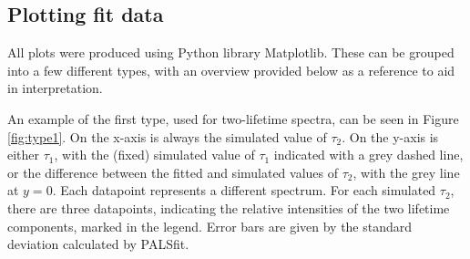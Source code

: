 \subsection{Plotting fit data}

All plots were produced using Python library Matplotlib. These can be grouped into a few different types, with an overview provided below as a reference to aid in interpretation.

An example of the first type, used for two-lifetime spectra, can be seen in Figure \ref{fig:type1}. On the x-axis is always the simulated value of $\tau_2$. On the y-axis is either $\tau_1$, with the (fixed) simulated value of $\tau_1$ indicated with a grey dashed line, or the difference between the fitted and simulated values of $\tau_2$, with the grey line at $y=0$. Each datapoint represents a different spectrum. For each simulated $\tau_2$, there are three datapoints, indicating the relative intensities of the two lifetime components, marked in the legend. Error bars are given by the standard deviation calculated by PALSfit.

